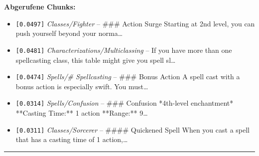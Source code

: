 \noindent\textbf{Abgerufene Chunks:}
\begin{itemize}[noitemsep, topsep=2pt]
  \item[\textbf{\#1}] \texttt{[0.0497]} \textit{Classes/Fighter} -- \#\#\# Action Surge  Starting at 2nd level, you can push yourself beyond your norma\ldots
  \item[\textbf{\#2}] \texttt{[0.0481]} \textit{Characterizations/Multiclassing} -- If you have more than one spellcasting class, this table might give you spell sl\ldots
  \item[\textbf{\#3}] \texttt{[0.0474]} \textit{Spells/# Spellcasting} -- \#\#\# Bonus Action  A spell cast with a bonus action is especially swift. You must\ldots
  \item[\textbf{\#4}] \texttt{[0.0314]} \textit{Spells/Confusion} -- \#\#\# Confusion  *4th-level enchantment*  **Casting Time:** 1 action  **Range:** 9\ldots
  \item[\textbf{\#5}] \texttt{[0.0311]} \textit{Classes/Sorcerer} -- \#\#\#\# Quickened Spell  When you cast a spell that has a casting time of 1 action,\ldots
\end{itemize}
\vspace{4pt}
\hrule
\vspace{6pt}
